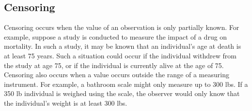 
\subsection{Censoring}
Censoring occurs when the value of an observation is only partially known. 
For example, suppose a study is conducted to measure the impact of a drug on mortality. 
In such a study, it may be known that an individual's age at death is at least 75 years. 
Such a situation could occur if the individual withdrew from the study at age 75, or if the individual is currently 
alive at the age of 75.
Censoring also occurs when a value occurs outside the range of a measuring instrument. 
For example, a bathroom scale might only measure up to 300 lbs. 
If a 350 lb individual is weighed using the scale, the observer would only know that the individual's weight is at 
least 300 lbs.



